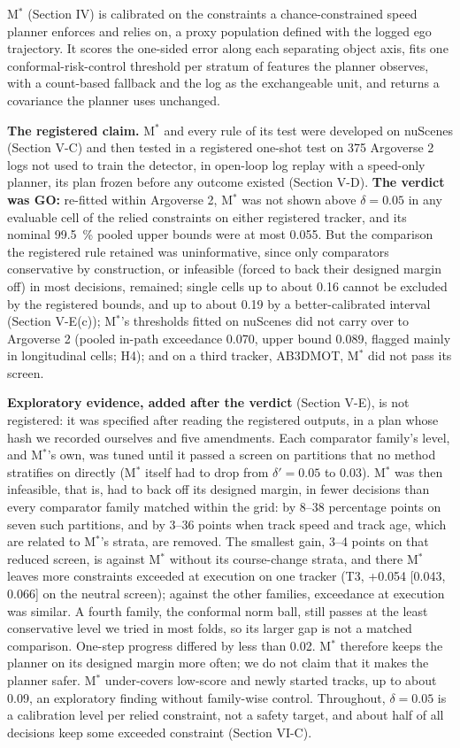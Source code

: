 \documentclass{ieeeaccess}
\begin{document}
M$^{*}$ (Section IV) is calibrated on the constraints a chance-constrained speed planner enforces and relies on, a proxy population defined with the logged ego trajectory. It scores the one-sided error along each separating object axis, fits one conformal-risk-control threshold per stratum of features the planner observes, with a count-based fallback and the log as the exchangeable unit, and returns a covariance the planner uses unchanged.

\textbf{The registered claim.} M$^{*}$ and every rule of its test were developed on nuScenes (Section V-C) and then tested in a registered one-shot test on 375 Argoverse 2 logs not used to train the detector, in open-loop log replay with a speed-only planner, its plan frozen before any outcome existed (Section V-D). \textbf{The verdict was GO:} re-fitted within Argoverse 2, M$^{*}$ was not shown above $\delta = 0.05$ in any evaluable cell of the relied constraints on either registered tracker, and its nominal 99.5~\% pooled upper bounds were at most 0.055. But the comparison the registered rule retained was uninformative, since only comparators conservative by construction, or infeasible (forced to back their designed margin off) in most decisions, remained; single cells up to about 0.16 cannot be excluded by the registered bounds, and up to about 0.19 by a better-calibrated interval (Section V-E(c)); M$^{*}$'s thresholds fitted on nuScenes did not carry over to Argoverse 2 (pooled in-path exceedance 0.070, upper bound 0.089, flagged mainly in longitudinal cells; H4); and on a third tracker, AB3DMOT, M$^{*}$ did not pass its screen.

\textbf{Exploratory evidence, added after the verdict} (Section V-E), is not registered: it was specified after reading the registered outputs, in a plan whose hash we recorded ourselves and five amendments. Each comparator family's level, and M$^{*}$'s own, was tuned until it passed a screen on partitions that no method stratifies on directly (M$^{*}$ itself had to drop from $\delta' = 0.05$ to 0.03). M$^{*}$ was then infeasible, that is, had to back off its designed margin, in fewer decisions than every comparator family matched within the grid: by 8--38 percentage points on seven such partitions, and by 3--36 points when track speed and track age, which are related to M$^{*}$'s strata, are removed. The smallest gain, 3--4 points on that reduced screen, is against M$^{*}$ without its course-change strata, and there M$^{*}$ leaves more constraints exceeded at execution on one tracker (T3, +0.054 [0.043, 0.066] on the neutral screen); against the other families, exceedance at execution was similar. A fourth family, the conformal norm ball, still passes at the least conservative level we tried in most folds, so its larger gap is not a matched comparison. One-step progress differed by less than 0.02. M$^{*}$ therefore keeps the planner on its designed margin more often; we do not claim that it makes the planner safer. M$^{*}$ under-covers low-score and newly started tracks, up to about 0.09, an exploratory finding without family-wise control. Throughout, $\delta = 0.05$ is a calibration level per relied constraint, not a safety target, and about half of all decisions keep some exceeded constraint (Section VI-C).
\end{document}
